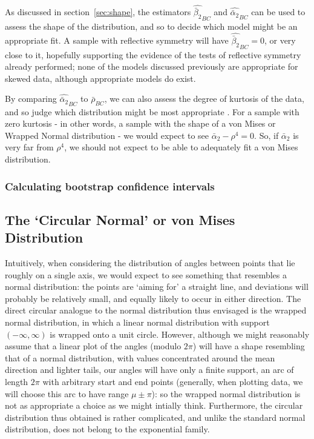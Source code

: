 \documentclass[../../ArchStats.tex]{subfiles}
\begin{document}
As discussed in section~\ref{sec:shape}, the estimators $\widehat{\bar{\beta}_2}_{BC}$  and $\widehat{\bar{\alpha}_2}_{BC}$ can be used to assess the shape of the distribution, and so to decide which model might be an appropriate fit. A sample with reflective symmetry will have $\widehat{\bar{\beta}_2}_{BC} = 0$, or very close to it, hopefully supporting the evidence of the tests of reflective symmetry already performed; none of the models discussed previously are appropriate for skewed data, although appropriate models do exist.

By comparing $\widehat{\bar{\alpha}_2}_{BC}$ to $\bar{\rho}_{BC}$, we can also assess the degree of kurtosis of the data, and so judge which distribution might be most appropriate . For a sample with zero kurtosis - in other words, a sample with the shape of a von Mises or Wrapped Normal distribution - we would expect to see $\bar{\alpha}_2 - \rho^4 = 0$. So, if $\bar{\alpha}_2$ is very far from $\rho^4$, we should not expect to be able to  adequately fit a von Mises distribution.

\subsubsection{Calculating bootstrap confidence intervals}



\subsection{The `Circular Normal' or von Mises Distribution}

Intuitively, when considering the distribution of angles between points that lie roughly on a single axis, we would expect to see something that resembles a normal distribution: the points are `aiming for' a straight line, and deviations will probably be relatively small, and equally likely to occur in either direction. The direct circular analogue to the normal distribution thus envisaged is the wrapped normal distribution, in which a linear normal distribution with support $(-\infty, \infty)$ is wrapped onto a unit circle. However, although we might reasonably assume that a linear plot of the angles (modulo $2\pi$) will have a shape resembling that of a normal distribution, with values concentrated around the mean direction and lighter tails, our angles will have only a finite support, an arc of length $2\pi$ with arbitrary start and end points (generally, when plotting data, we will choose this arc to have range $\mu \pm \pi$): so the wrapped normal distribution is not as appropriate a choice as we might intially think. Furthermore, the circular distribution thus obtained is rather complicated, and unlike the standard normal distribution, does not belong to the exponential family.
\end{document}
